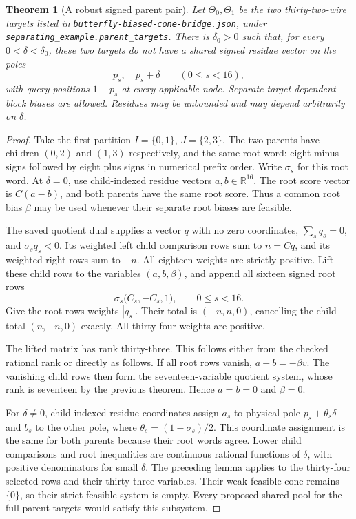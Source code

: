 \documentclass[11pt]{article}
\newtheorem{theorem}{Theorem}
\begin{document}
\begin{theorem}[A robust signed parent pair]
Let $\Theta_0,\Theta_1$ be the two thirty-two-wire targets listed in
\texttt{butterfly-biased-cone-bridge.json}, under
\texttt{separating\_example.parent\_targets}. There is $\delta_0>0$
such that, for every $0<\delta<\delta_0$, these two targets do not
have a shared signed residue vector on the poles
\[
 p_s,\quad p_s+\delta\qquad(0\leq s<16),
\]
with query positions $1-p_s$ at every applicable node. Separate
target-dependent block biases are allowed. Residues may be unbounded
and may depend arbitrarily on $\delta$.
\end{theorem}
\begin{proof}
Take the first partition $I=\{0,1\}$, $J=\{2,3\}$.
The two parents have children $(0,2)$ and $(1,3)$ respectively,
and the same root word: eight minus signs followed by eight plus
signs in numerical prefix order. Write $\sigma_s$ for this root word.
At $\delta=0$, use child-indexed residue vectors $a,b\in\mathbb R^{16}$.
The root score vector is $C(a-b)$, and both parents have the same
root score. Thus a common root bias $\beta$ may be used whenever
their separate root biases are feasible.

The saved quotient dual supplies a vector $q$ with no zero coordinates,
$\sum_s q_s=0$, and $\sigma_s q_s<0$. Its weighted left child
comparison rows sum to $n=Cq$, and its weighted right rows sum to $-n$.
All eighteen weights are strictly positive. Lift these child rows to
the variables $(a,b,\beta)$, and append all sixteen signed root rows
\[
 \sigma_s\bigl(C_s,-C_s,1\bigr),\qquad 0\leq s<16.
\]
Give the root rows weights $|q_s|$. Their total is
$(-n,n,0)$, cancelling the child total $(n,-n,0)$ exactly.
All thirty-four weights are positive.

The lifted matrix has rank thirty-three. This follows either from
the checked rational rank or directly as follows. If all root rows
vanish, $a-b=-\beta v$. The vanishing child rows then form the
seventeen-variable quotient system, whose rank is seventeen by the
previous theorem. Hence $a=b=0$ and $\beta=0$.

For $\delta\ne0$, child-indexed residue coordinates assign $a_s$
to physical pole $p_s+\theta_s\delta$ and $b_s$ to the other pole,
where $\theta_s=(1-\sigma_s)/2$. This coordinate assignment is the
same for both parents because their root words agree. Lower child
comparisons and root inequalities are continuous rational functions
of $\delta$, with positive denominators for small $\delta$.
The preceding lemma applies to the thirty-four selected rows and
their thirty-three variables. Their weak feasible cone remains
$\{0\}$, so their strict feasible system is empty. Every proposed
shared pool for the full parent targets would satisfy this subsystem.
\end{proof}
\end{document}
